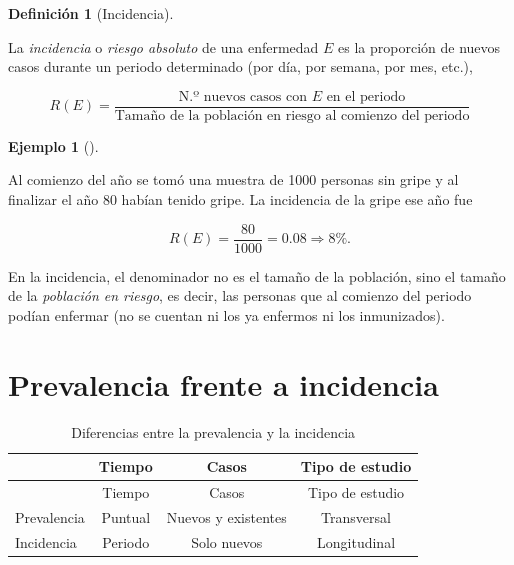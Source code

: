 \documentclass[
  spanish,
  a4paper,
]{scrreport}
\theoremstyle{definition}
\newtheorem{definition}{Definición}[chapter]
\theoremstyle{definition}
\newtheorem{example}{Ejemplo}[chapter]
\theoremstyle{remark}
\begin{document}
\begin{definition}[Incidencia]\protect\hypertarget{def-incidencia}{}\label{def-incidencia}

La \emph{incidencia} o \emph{riesgo absoluto} de una enfermedad \(E\) es
la proporción de nuevos casos durante un periodo determinado (por día,
por semana, por mes, etc.),

\[R(E)=\frac{\mbox{N.º nuevos casos con $E$ en el periodo}}{\mbox{Tamaño de la población en riesgo al comienzo del periodo}}\]

\end{definition}

\begin{example}[]\protect\hypertarget{exm-incidencia}{}\label{exm-incidencia}

Al comienzo del año se tomó una muestra de 1000 personas sin gripe y al
finalizar el año 80 habían tenido gripe. La incidencia de la gripe ese
año fue

\[R(E) = \frac{80}{1000} = 0.08 \Rightarrow 8\%.\]

\end{example}

\begin{tcolorbox}[enhanced jigsaw, arc=.35mm, bottomrule=.15mm, bottomtitle=1mm, breakable, colback=white, colbacktitle=quarto-callout-important-color!10!white, colframe=quarto-callout-important-color-frame, coltitle=black, left=2mm, leftrule=.75mm, opacityback=0, opacitybacktitle=0.6, rightrule=.15mm, title=\textcolor{quarto-callout-important-color}{\faExclamation}\hspace{0.5em}{Importante}, titlerule=0mm, toprule=.15mm, toptitle=1mm]

En la incidencia, el denominador no es el tamaño de la población, sino
el tamaño de la \emph{población en riesgo}, es decir, las personas que
al comienzo del periodo podían enfermar (no se cuentan ni los ya
enfermos ni los inmunizados).

\end{tcolorbox}

\section{Prevalencia frente a
incidencia}\label{prevalencia-frente-a-incidencia}

\begin{longtable}[]{@{}lccc@{}}
\caption{Diferencias entre la prevalencia y la
incidencia}\label{tbl-prevalencia-incidencia}\tabularnewline
\toprule\noalign{}
& Tiempo & Casos & Tipo de estudio \\
\midrule\noalign{}
\endfirsthead
\toprule\noalign{}
& Tiempo & Casos & Tipo de estudio \\
\midrule\noalign{}
\endhead
\bottomrule\noalign{}
\endlastfoot
Prevalencia & Puntual & Nuevos y existentes & Transversal \\
Incidencia & Periodo & Solo nuevos & Longitudinal \\
\end{longtable}
\end{document}
